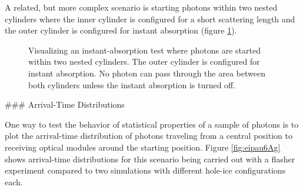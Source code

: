 A related, but more complex scenario is starting photons within two nested cylinders where the inner cylinder is configured for a short scattering length and the outer cylinder is configured for instant absorption (figure \ref{fig:sahmoo8O}).


\begin{figure}[htbp]
  \hfill
  \hfill
  \caption{Visualizing an instant-absorption test where photons are started within two nested cylinders. The outer cylinder is configured for instant absorption. No photon can pass through the area between both cylinders unless the instant absorption is turned off.}
  \label{fig:sahmoo8O}
\end{figure}


### Arrival-Time Distributions
\label{sec:arrival_time}


One way to test the behavior of statistical properties of a sample of photons is to plot the arrival-time distribution of photons traveling from a central position to receiving optical modules around the starting position.
Figure \ref{fig:eipau6Ag} shows arrival-time distributions for this scenario being carried out with a flasher experiment compared to two simulations with different hole-ice configurations each.

